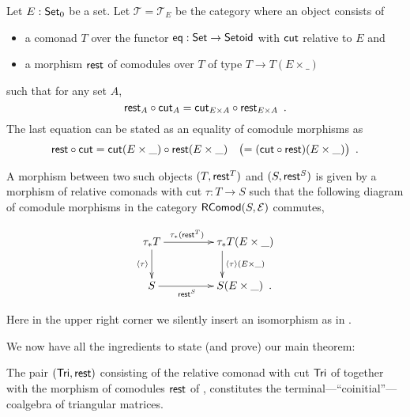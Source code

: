 \documentclass{amsart}
\begin{document}
\begin{definition}\label{def:cat_tri}
   Let $E:\mathsf{Set}_0$ be a set.
   Let $\mathcal{T} = \mathcal{T}_E$ be the category where an object consists of
   \begin{itemize}
    \item a comonad $T$ over the functor $\mathsf{eq}:\mathsf{Set}\to\mathsf{Setoid}$ with $\mathsf{cut}$ relative to $E$ and
    \item a morphism $\mathsf{rest}$ of comodules over $T$ of type $T \to T(E\times \_)$
   \end{itemize}
   such that for any set $A$,
    \[ {\mathsf{rest}_A} \circ {\ensuremath{\mathsf{cut}}_A} = {\mathsf{cut}_{E\times A}} \circ {\ensuremath{\mathsf{rest}}_{E\times A}} \enspace . \]
   The last equation can be stated as an equality of comodule morphisms as
     \[ {\mathsf{rest}} \circ {\ensuremath{\mathsf{cut}}} = {\mathsf{cut}(E\times\_)} \circ {\ensuremath{\mathsf{rest}}(E\times \_)} \quad \bigl( = ({\mathsf{cut}} \circ {\ensuremath{\mathsf{rest}}})(E\times \_)\bigr)\enspace . \]

  
   
   A morphism between two such objects $(T,\mathsf{rest}^T)$ and $(S,\mathsf{rest}^S)$
   is given by a morphism of relative comonads with cut $\tau : T \to S$ such that
   the following diagram of comodule morphisms in the category $\mathsf{RComod}(S,\mathcal{E})$ commutes,
   
   \[ \begin{xy}
       \xymatrix{   \tau_*T  \ar[r]^{\tau_*(\tail^T)} \ar[d]_{\induced{\tau}}  &  **[r] \tau_*T (E\times \_ )\ar[d]^{\induced{\tau}(E\times \_)} \\
                    S  \ar[r]_{\tail^S}  &  **[r] S (E\times \_ ) \enspace .
        }
      \end{xy}
   \]

   \noindent
   Here in the upper right corner we silently insert an isomorphism as in .
\end{definition}   
   
We now have all the ingredients to state (and prove) our main theorem:
\begin{theorem}\label{ex:final_sem_tri} %
   The pair $(\mathsf{Tri}, \mathsf{rest})$ consisting of the relative comonad with cut $\mathsf{Tri}$ of  together with 
    the morphism of comodules $\mathsf{rest}$ of ,
   constitutes the terminal---\enquote{coinitial}---coalgebra of triangular matrices.
\end{theorem}
\end{document}
